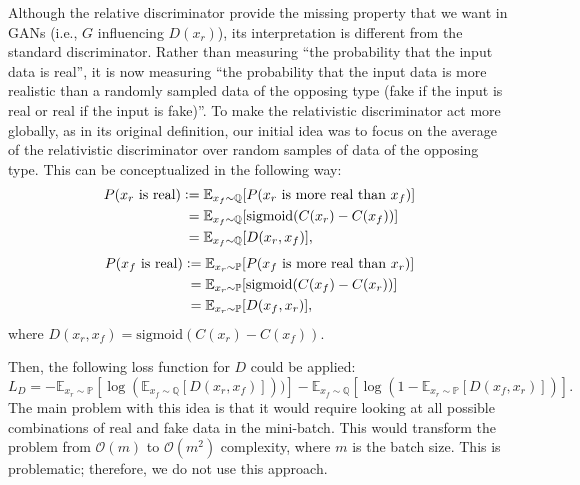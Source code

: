 \documentclass{article}
\begin{document}
Although the relative discriminator provide the missing property that we want in GANs (i.e., $G$ influencing $D(x_r)$), its interpretation is different from the standard discriminator. Rather than measuring “the probability that the input data is real”, it is now measuring “the probability that the input data is more realistic than a randomly sampled data of the opposing type (fake if the input is real or real if the input is fake)”. To make the relativistic discriminator act more globally, as in its original definition, our initial idea was to focus on the average of the relativistic discriminator over random samples of data of the opposing type. This can be conceptualized in the following way:
\begin{align*}
P(x_r \text{ is real}) &\vcentcolon= \mathbb{E}_{x_f \sim \mathbb{Q}}[P(x_r \text{ is more real than } x_f)] \\
&\phantom{\vcentcolon}= \mathbb{E}_{x_f \sim \mathbb{Q}}[\text{sigmoid}(C(x_r)-C(x_f))] \\
&\phantom{\vcentcolon}= \mathbb{E}_{x_f \sim \mathbb{Q}}[D(x_r, x_f)],
\end{align*}
\begin{align*}
P(x_f \text{ is real}) &\vcentcolon= \mathbb{E}_{x_r \sim \mathbb{P}}[P(x_f \text{ is more real than } x_r)] \\
&\phantom{\vcentcolon}= \mathbb{E}_{x_r \sim \mathbb{P}}[\text{sigmoid}(C(x_f)-C(x_r))] \\
&\phantom{\vcentcolon}= \mathbb{E}_{x_r \sim \mathbb{P}}[D(x_f, x_r)],
\end{align*}
where $D(x_r,x_f)=\text{sigmoid}(C(x_r)-C(x_f))$.

Then, the following loss function for $D$ could be applied:
\begin{equation}
L_D = -\mathbb{E}_{x_r \sim \mathbb{P}}\left[ \log \left( \mathbb{E}_{x_f \sim \mathbb{Q}}[D(x_r, x_f)] \right)) \right] - \mathbb{E}_{x_f \sim \mathbb{Q}} \left[ \log \left( 1 -  \mathbb{E}_{x_r \sim \mathbb{P}}[D(x_f, x_r)]\right) \right].
\end{equation}
The main problem with this idea is that it would require looking at all possible combinations of real and fake data in the mini-batch. This would transform the problem from $\mathcal{O}(m)$ to $\mathcal{O}(m^2)$ complexity, where $m$ is the batch size. This is problematic; therefore, we do not use this approach.
\end{document}
